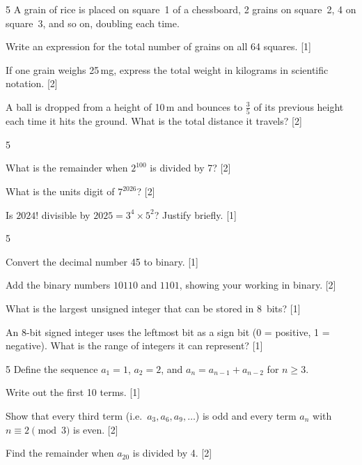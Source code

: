 \begin{problem}{5}
A grain of rice is placed on square~1 of a chessboard, 2 grains on
square~2, 4 on square~3, and so on, doubling each time.
\begin{parts}
  \item Write an expression for the total number of grains on all
        64 squares. \hfill [1]
  \item If one grain weighs 25\,mg, express the total weight in kilograms
        in scientific notation. \hfill [2]
  \item A ball is dropped from a height of 10\,m and bounces to
        $\tfrac{3}{5}$ of its previous height each time it hits the ground.
        What is the total distance it travels? \hfill [2]
\end{parts}
\answerline
\end{problem}

\begin{problem}{5}
\begin{parts}
  \item What is the remainder when $2^{100}$ is divided by 7? \hfill [2]
  \item What is the units digit of $7^{2026}$? \hfill [2]
  \item Is $2024!$ divisible by $2025 = 3^4 \times 5^2$? Justify briefly.
        \hfill [1]
\end{parts}
\answerline
\end{problem}

\begin{problem}{5}
\begin{parts}
  \item Convert the decimal number 45 to binary. \hfill [1]
  \item Add the binary numbers $10110$ and $1101$, showing your working
        in binary. \hfill [2]
  \item What is the largest unsigned integer that can be stored in 8~bits?
        \hfill [1]
  \item An 8-bit signed integer uses the leftmost bit as a sign bit
        (0 = positive, 1 = negative). What is the range of integers it
        can represent? \hfill [1]
\end{parts}
\answerline
\end{problem}

\begin{problem}{5}
Define the sequence $a_1 = 1$, $a_2 = 2$, and $a_n = a_{n-1} + a_{n-2}$
for $n \ge 3$.
\begin{parts}
  \item Write out the first 10 terms. \hfill [1]
  \item Show that every third term (i.e.\ $a_3, a_6, a_9, \ldots$) is odd
        and every term $a_n$ with $n \equiv 2 \pmod{3}$ is even. \hfill [2]
  \item Find the remainder when $a_{20}$ is divided by 4. \hfill [2]
\end{parts}
\answerline
\end{problem}

